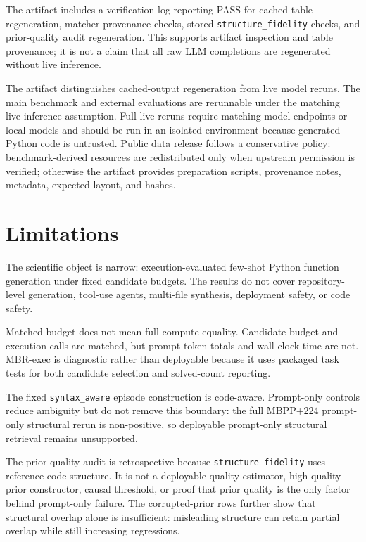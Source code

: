 \documentclass{article}
\newcommand{\code}[1]{\texttt{#1}}
\begin{document}
The artifact includes a verification log reporting PASS for cached table regeneration, matcher provenance checks, stored \code{structure\_fidelity} checks, and prior-quality audit regeneration. This supports artifact inspection and table provenance; it is not a claim that all raw LLM completions are regenerated without live inference.

The artifact distinguishes cached-output regeneration from live model reruns. The main benchmark and external evaluations are rerunnable under the matching live-inference assumption. Full live reruns require matching model endpoints or local models and should be run in an isolated environment because generated Python code is untrusted. Public data release follows a conservative policy: benchmark-derived resources are redistributed only when upstream permission is verified; otherwise the artifact provides preparation scripts, provenance notes, metadata, expected layout, and hashes.

\section{Limitations}
The scientific object is narrow: execution-evaluated few-shot Python function generation under fixed candidate budgets. The results do not cover repository-level generation, tool-use agents, multi-file synthesis, deployment safety, or code safety.

Matched budget does not mean full compute equality. Candidate budget and execution calls are matched, but prompt-token totals and wall-clock time are not. MBR-exec is diagnostic rather than deployable because it uses packaged task tests for both candidate selection and solved-count reporting.

The fixed \code{syntax\_aware} episode construction is code-aware. Prompt-only controls reduce ambiguity but do not remove this boundary: the full MBPP+224 prompt-only structural rerun is non-positive, so deployable prompt-only structural retrieval remains unsupported.

The prior-quality audit is retrospective because \code{structure\_fidelity} uses reference-code structure. It is not a deployable quality estimator, high-quality prior constructor, causal threshold, or proof that prior quality is the only factor behind prompt-only failure. The corrupted-prior rows further show that structural overlap alone is insufficient: misleading structure can retain partial overlap while still increasing regressions.
\end{document}
